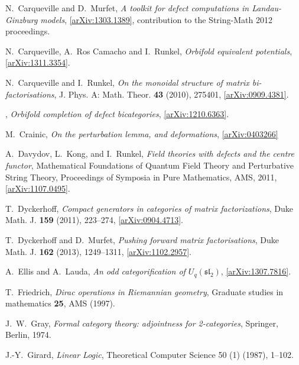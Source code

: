\documentclass[english,letter paper,12pt,leqno]{article}
\theoremstyle{example}
\numberwithin{equation}{section}
\begin{document}
\begin{thebibliography}{BHLS03}
N.~Carqueville and D.~Murfet, \textsl{A toolkit for defect computations in Landau-Ginzburg models}, \href{http://arxiv.org/abs/1303.1389}{[arXiv:1303.1389]}, contribution to the String-Math 2012 proceedings.

N.~Carqueville, A.~Ros Camacho and I.~Runkel, \textsl{Orbifold equivalent potentials}, \href{http://arxiv.org/abs/1311.3354}{[arXiv:1311.3354]}.

N.~Carqueville and I.~Runkel, \textsl{On the monoidal structure of matrix bi-factorisations}, J. Phys.
  A: Math. Theor. \textbf{43} (2010), 275401,
  \href{http://arxiv.org/abs/0909.4381}{[arXiv:0909.4381]}.
  
\bysame, \textsl{Orbifold completion of defect bicategories}, 
\href{http://arxiv.org/abs/1210.6363}{[arXiv:1210.6363]}.

M.~Crainic, \emph{On the perturbation lemma, and deformations}, \href{http://arxiv.org/abs/math/0403266}{[arXiv:0403266]}

A.~Davydov, L.~Kong, and I.~Runkel, \textsl{Field theories with defects and the
  centre functor}, Mathematical Foundations of Quantum Field Theory and Perturbative String Theory, 
  Proceedings of Symposia in Pure Mathematics, AMS, 2011, \href{http://arxiv.org/abs/1107.0495}{[arXiv:1107.0495]}.
  
T.~Dyckerhoff, \textsl{Compact generators in categories of matrix factorizations},
  Duke Math. J. \textbf{159} (2011), 223--274,
  \href{http://arxiv.org/abs/0904.4713}{[arXiv:0904.4713]}.

T.~Dyckerhoff and D.~Murfet, \textsl{Pushing forward matrix factorisations}, Duke Math. J. \textbf{162} (2013), 1249--1311, \href{http://arxiv.org/abs/1102.2957}{[arXiv:1102.2957]}.

A.~Ellis and A.~Lauda, \textsl{An odd categorification of $U_q(\mathfrak{sl}_2)$}, \href{http://arxiv.org/abs/1307.7816}{[arXiv:1307.7816]}.

T.~Friedrich, \textsl{{D}irac operations in {R}iemannian geometry}, Graduate studies in mathematics \textbf{25}, AMS (1997).
  
J.~W.~Gray, \textsl{Formal category theory: adjointness for 2-categories}, Springer, Berlin, 1974.

J.-Y.~Girard, \textsl{Linear Logic}, Theoretical Computer Science 50 (1) (1987), 1--102.


\end{thebibliography}
\end{document}
